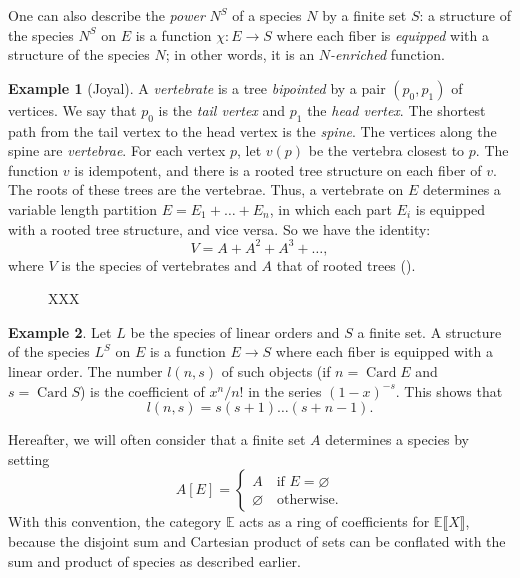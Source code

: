 \documentclass{amsart}
\theoremstyle{definition}
\newtheorem{ex}{Example}
\theoremstyle{remark}
\newcommand{\E}{\mathbb{E}}
\DeclareMathOperator{\Card}{Card}
\newcommand{\Poly}[2]{#1 \llbracket #2 \rrbracket}
\newcommand{\term}[1]{\emph{#1}}
\newcommand{\pref}[1]{\prettyref{#1}}
\begin{document}
One can also describe the \term{power} $N^S$ of a species $N$ by a
finite set $S$: a structure of the species $N^S$ on $E$ is a function
$\chi : E \to S$ where each fiber is \emph{equipped} with a structure
of the species $N$; in other words, it is an \emph{$N$-enriched}
function.

\begin{ex}[Joyal] \label{ex:vertebrate}
  A \emph{vertebrate} is a tree \term{bipointed} by a pair $(p_0,
  p_1)$ of vertices. We say that $p_0$ is the \term{tail vertex} and
  $p_1$ the \term{head vertex}. The shortest path from the tail vertex
  to the head vertex is the \term{spine}. The vertices along the spine
  are \term{vertebrae}. For each vertex $p$, let $v(p)$ be the
  vertebra closest to $p$. The function $v$ is idempotent, and there
  is a rooted tree structure on each fiber of $v$.  The roots of these
  trees are the vertebrae. Thus, a vertebrate on $E$ determines a
  variable length partition $E = E_1 + \dots + E_n$, in which each
  part $E_i$ is equipped with a rooted tree structure, and vice
  versa. So we have the identity:
  \[ V = A + A^2 + A^3 + \dots, \] where $V$ is the species of
  vertebrates and $A$ that of rooted trees (\pref{fig:vertebrate}).
\end{ex}

\begin{figure}
  \centering
  \caption{XXX}
  \label{fig:vertebrate}
\end{figure}

\begin{ex}
  Let $L$ be the species of linear orders and $S$ a finite set.  A
  structure of the species $L^S$ on $E$ is a function $E \to S$ where
  each fiber is equipped with a linear order. The number $l(n, s)$ of
  such objects (if $n = \Card E$ and $s = \Card S$) is the coefficient
  of $x^n/n!$ in the series $(1-x)^{-s}$. This shows that
  \[ l(n, s) = s (s + 1) \dots (s + n-1). \]
\end{ex}

Hereafter, we will often consider that a finite set $A$
determines a species by setting
\[ A [E] = \begin{cases} A \quad \text{if $E = \varnothing$} \\ \varnothing \quad \text{otherwise}. \end{cases} \]
With this convention, the category $\E$ acts as a ring of coefficients
for $\Poly \E X$, because the disjoint sum and Cartesian product of sets
can be conflated with the sum and product of species as described
earlier.
\end{document}
